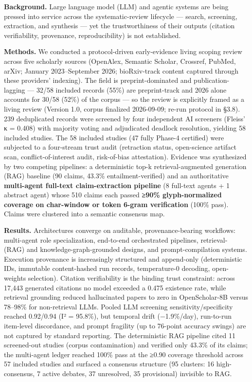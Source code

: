 \documentclass[11pt]{article}
\begin{document}
\textbf{Background.} Large language model (LLM) and agentic systems are
being pressed into service across the systematic-review lifecycle ---
search, screening, extraction, and synthesis --- yet the trustworthiness
of their outputs (citation verifiability, provenance, reproducibility)
is not established.

\textbf{Methods.} We conducted a protocol-driven early-evidence living
scoping review across five scholarly sources (OpenAlex, Semantic
Scholar, Crossref, PubMed, arXiv; January 2023--September 2026;
bioRxiv-track content captured through these providers' indexing). The
field is preprint-dominated and publication-lagging --- 32/58 included
records (55\%) are preprint-track and 2026 alone accounts for 30/58
(52\%) of the corpus --- so the review is explicitly framed as a living
review (Version 1.0, corpus finalized 2026-09-09; re-run protocol in
§3.8). 239 deduplicated records were screened by four independent AI
screeners (Fleiss' κ = 0.408) with majority voting and adjudicated
deadlock resolution, yielding 58 included studies. The 58 included
studies (47 fully Phase-4 certified) were subjected to a four-stream
trust audit (retraction status, open-science artifact scan,
conflict-of-interest audit, risk-of-bias attestation). Evidence was
synthesized by two competing pipelines: a deterministic top-k
retrieval-augmented generation (RAG) baseline (90 claims, 43.3\%
entailment-verified) and an authoritative \textbf{multi-agent full-text
claim-extraction pipeline} (8 full-text agents + 1 abstract agent) whose
510 claims each passed \textbf{≥90\% glyph-normalized coverage on
char-window or token 6-gram verification} (100\% pass). Claims were
clustered into a semantic consensus map.

\textbf{Results.} Architectures converge on auditable,
provenance-bearing workflows: multi-agent role specialization,
end-to-end orchestrated pipelines, retrieval- (RAG) and
knowledge-graph-grounded designs, and prompt-compilation systems.
Execution provenance is increasingly structured and append-only
(deterministic IDs, immutable content-hashed run records, temperature-0
decoding, open-weights selection). Citation verifiability is the binding
trust constraint: across 17,443 generated citations no model exceeded a
0.475 existence rate, while retrieval grounding reduced hallucinated
papers to zero in OpenScholar-8B versus 78--98\% for non-retrieval LLMs.
Pooled LLM screening sensitivity/specificity reached 0.92/0.94 (I² =
95.8\%), but temporal drift (−1.9\%/day), run-to-run item-level
discordance, and prompt fragility (up to 76-point accuracy swings) are
not captured by standard reporting. The deterministic RAG pipeline cited
11 screened-out studies (corpus contamination) and verified only 43.3\%
of its claims; the multi-agent ledger reached 100\% pass at the ≥0.90
coverage threshold across 57 included studies and surfaced a consensus
structure (95 clusters: 16 high-consensus, 7 active debates, 37
unresolved, 35 provisional) invisible to RAG.
\end{document}
